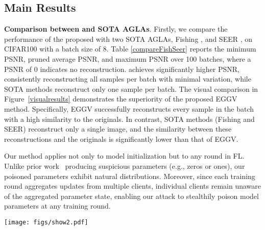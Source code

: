 \subsection{Main Results}
\textbf{Comparison between \name and SOTA AGLAs}.
Firstly, we compare the performance of the proposed \name with two SOTA AGLAs, Fishing \cite{wen2022fishing}, and SEER \cite{Garov2024Hiding}, on CIFAR100 with a batch size of 8. Table \ref{compareFishSeer} reports the minimum PSNR, pruned average PSNR, and maximum PSNR over 100 batches, where a PSNR of 0 indicates no reconstruction. \name achieves significantly higher PSNR, consistently reconstructing all samples per batch with minimal variation, while SOTA methods reconstruct only one sample per batch. 
The visual comparison in Figure~\ref{visualresults} demonstrates the superiority of the proposed EGGV method. Specifically, EGGV successfully reconstructs every sample in the batch with a high similarity to the originals. In contrast, SOTA methods (Fishing and SEER) reconstruct only a single image, and the similarity between these reconstructions and the originals is significantly lower than that of EGGV.
\begin{remark} 
Our method applies not only to model initialization but to any round in FL. Unlike prior work~\cite{wen2022fishing, zhang2022compromise} producing suspicious parameters (e.g., zeros or ones), our poisoned parameters exhibit natural distributions. Moreover, since each training round aggregates updates from multiple clients, individual clients remain unaware of the aggregated parameter state, enabling our attack to stealthily poison model parameters at any training round.
\end{remark}
\begin{figure*}[t]
    \centering
    \texttt{[image: figs/show2.pdf]}
    \caption{Visual reconstruction of IG on the model with \name poisoning, Xavier initialization, and He initialization.}
    \label{visualresults}
\end{figure*}

